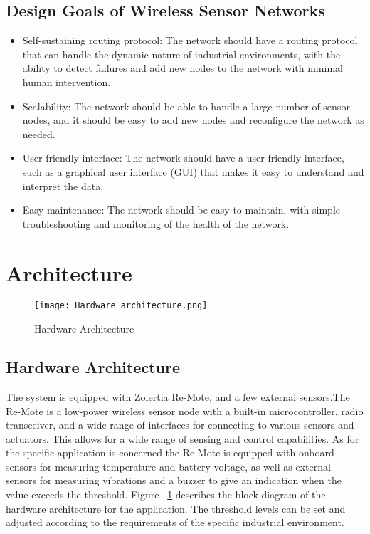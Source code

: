 \documentclass[conference]{IEEEtran}
\begin{document}
\subsection{Design Goals of Wireless Sensor Networks}\label{AA}
\begin{itemize}
    \item Self-sustaining routing protocol: The network should have a routing protocol that can handle the dynamic nature of industrial environments, with the ability to detect failures and add new nodes to the network with minimal human intervention.
    \item Scalability: The network should be able to handle a large number of sensor nodes, and it should be easy to add new nodes and reconfigure the network as needed.
    \item User-friendly interface: The network should have a user-friendly interface, such as a graphical user interface (GUI) that makes it easy to understand and interpret the data.
    \item Easy maintenance: The network should be easy to maintain, with simple troubleshooting and monitoring of the health of the network.
\end{itemize}

\section{Architecture}


\begin{figure}
  \texttt{[image: Hardware architecture.png]}
  \caption{Hardware Architecture}
  \label{fig:hardware architecture}
\end{figure}

\subsection{Hardware Architecture}\label{AA}
The system is equipped with Zolertia Re-Mote, and a few external sensors.The Re-Mote is a low-power wireless sensor node with a built-in microcontroller, radio transceiver, and a wide range of interfaces for connecting to various sensors and actuators. This allows for a wide range of sensing and control capabilities. As for the specific application is concerned the Re-Mote is equipped with onboard sensors for measuring temperature and battery voltage, as well as external sensors for measuring vibrations and a buzzer to give an indication when the value exceeds the threshold. Figure ~\ref{fig:hardware architecture}  describes the block diagram of the hardware architecture for the application.  The threshold levels can be set and adjusted according to the requirements of the specific industrial environment.
\end{document}
